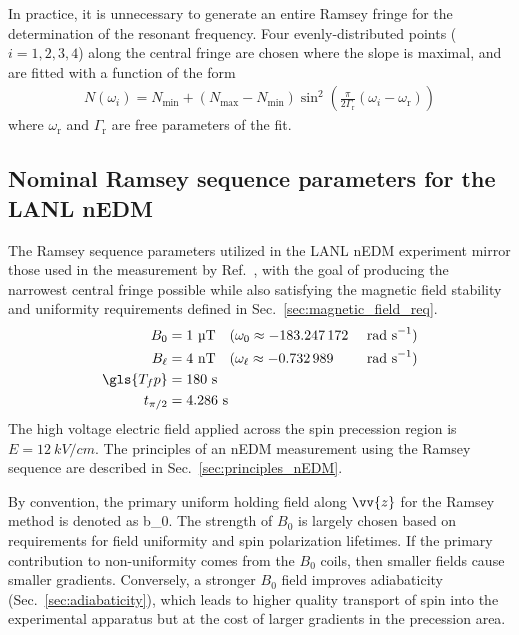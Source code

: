 In practice, it is unnecessary to generate an entire Ramsey fringe for the determination of the resonant frequency. Four evenly-distributed points ($i=1,2,3,4$) along the central fringe are chosen where the slope is maximal, and are fitted with a function of the form~\cite{may_thesis}
%
\begin{gather}
    N(\omega_i)=N_\text{min} + (N_\text{max}-N_\text{min})\sin^2\left(\frac{\pi}{2\Gamma_\text{r}}(\omega_i-\omega_\text{r}) \right) \label{eq:four_point_ramsey_fringe_fit}
\end{gather}
%
where $\omega_\text{r}$ and $\Gamma_\text{r}$ are free parameters of the fit.





\subsection{Nominal Ramsey sequence parameters for the LANL nEDM}\label{sec:LANL_nEDM_ramsey_params}


The Ramsey sequence parameters utilized in the LANL nEDM experiment mirror those used in the measurement by Ref.~\cite{ABE20}, with the goal of producing the narrowest central fringe possible while also satisfying the magnetic field stability and uniformity requirements defined in Sec.~\ref{sec:magnetic_field_req}.
%
\begin{alignat}{3}
    B_0 &= 1\text{ \textmu T} \quad (\omega_0 \approx -183.247\,172 &&\text{ rad s}^{-1} ) \\
    B_\ell &= 4 \text{ nT} \quad (\omega_\ell \approx -0.732\,989 &&\text{ rad s}^{-1} ) \\
    \gls{T_fp} &= 180\text{ s} \\
    t_{\pi/2} &= 4.286\text{ s}
\end{alignat}
%
The high voltage electric field applied across the spin precession region is $E=\qty{12}{kV\per cm}$. The principles of an nEDM measurement using the Ramsey sequence are described in Sec.~\ref{sec:principles_nEDM}.

By convention, the primary uniform holding field along $\vv{z}$ for the Ramsey method is denoted as \gls*{b_0}. The strength of $B_0$ is largely chosen based on requirements for field uniformity and spin polarization lifetimes. If the primary contribution to non-uniformity comes from the $B_0$ coils, then smaller fields cause smaller gradients. Conversely, a stronger $B_0$ field improves adiabaticity (Sec.~\ref{sec:adiabaticity}), which leads to higher quality transport of \ucn spin into the experimental apparatus but at the cost of larger gradients in the precession area.



